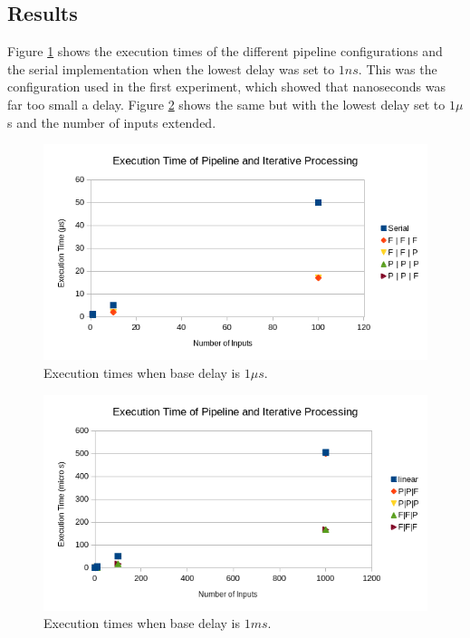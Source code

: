 \documentclass[12pt]{article}
\begin{document}
\subsection{Results}

Figure \ref{fig:results} shows the execution times of the different pipeline configurations and the serial implementation when the lowest delay was set to $1ns$. This was the configuration used in the first experiment, which showed that nanoseconds was far too small a delay. Figure \ref{fig:results2} shows the same but with the lowest delay set to $1\mu$s and the number of inputs extended.

\begin{figure}[!ht]
	\centering 
	\includegraphics[width=\linewidth]{images/results}
	\caption{Execution times when base delay is $1\mu s$.}
	\label{fig:results}
\end{figure}

\begin{figure}[!ht]
	\centering 
	\includegraphics[width=\linewidth]{images/results1}
	\caption{Execution times when base delay is $1ms$.}
	\label{fig:results2}
\end{figure}
\end{document}
